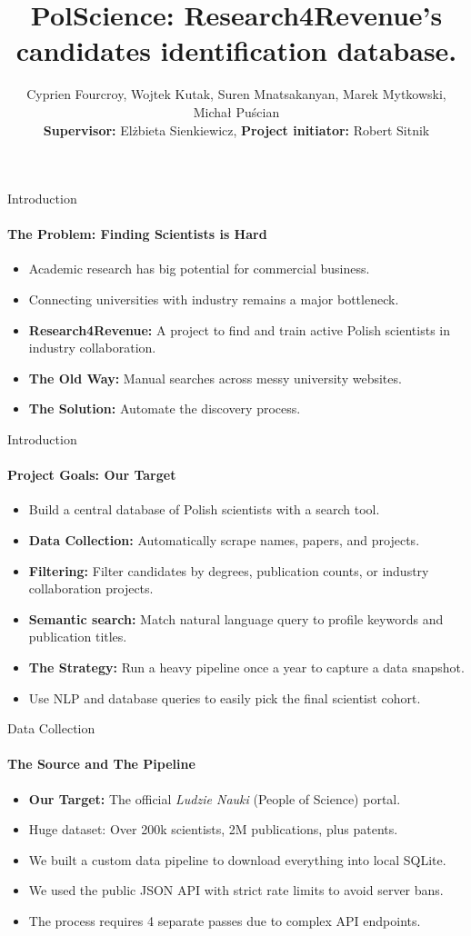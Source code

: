 \documentclass{beamer}
\title{PolScience: Research4Revenue's candidates identification database.}
\author{Cyprien Fourcroy, Wojtek Kutak, Suren Mnatsakanyan,  Marek Mytkowski, Michał Puścian \\
\textbf{Supervisor:} Elżbieta Sienkiewicz, \textbf{Project initiator:} Robert Sitnik}
\begin{document}
\frame{\titlepage}

\begin{frame}{Introduction}
    \framesubtitle{The Problem: Finding Scientists is Hard}
    \begin{itemize}
        \item Academic research has big potential for commercial business.
        \item Connecting universities with industry remains a major bottleneck.
        \item \textbf{Research4Revenue:} A project to find and train active Polish scientists in industry collaboration.
        \item \textbf{The Old Way:} Manual searches across messy university websites.
        \item \textbf{The Solution:} Automate the discovery process.
    \end{itemize}
\end{frame}

\begin{frame}{Introduction}
    \framesubtitle{Project Goals: Our Target}
    \begin{itemize}
        \item Build a central database of Polish scientists with a search tool.
        \item \textbf{Data Collection:} Automatically scrape names, papers, and projects.
        \item \textbf{Filtering:} Filter candidates by degrees, publication counts, or industry collaboration projects.
        \item \textbf{Semantic search:} Match natural language query to profile keywords and publication titles.
        \item \textbf{The Strategy:} Run a heavy pipeline once a year to capture a data snapshot.
        \item Use NLP and database queries to easily pick the final scientist cohort.
    \end{itemize}
\end{frame}

\begin{frame}{Data Collection}
    \framesubtitle{The Source and The Pipeline}
    \begin{itemize}
        \item \textbf{Our Target:} The official \textit{Ludzie Nauki} (People of Science) portal.
        \item Huge dataset: Over 200k scientists, 2M publications, plus patents.
        \item We built a custom data pipeline to download everything into local SQLite.
        \item We used the public JSON API with strict rate limits to avoid server bans.
        \item The process requires 4 separate passes due to complex API endpoints.
    \end{itemize}
\end{frame}
\end{document}
